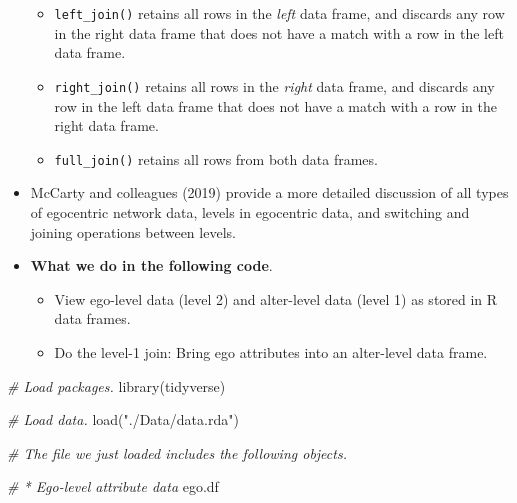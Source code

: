 \documentclass[
]{book}
\newenvironment{Shaded}{\begin{snugshade}}{\end{snugshade}}
\newcommand{\CommentTok}[1]{\textcolor[rgb]{0.56,0.35,0.01}{\textit{#1}}}
\newcommand{\FunctionTok}[1]{\textcolor[rgb]{0.00,0.00,0.00}{#1}}
\newcommand{\NormalTok}[1]{#1}
\newcommand{\StringTok}[1]{\textcolor[rgb]{0.31,0.60,0.02}{#1}}
\providecommand{\tightlist}{%
  \setlength{\itemsep}{0pt}\setlength{\parskip}{0pt}}
\begin{document}
\begin{itemize}
  \begin{itemize}
  \tightlist
  \item
    \texttt{left\_join()} retains all rows in the \emph{left} data frame, and discards any row in the right data frame that does not have a match with a row in the left data frame.
  \item
    \texttt{right\_join()} retains all rows in the \emph{right} data frame, and discards any row in the left data frame that does not have a match with a row in the right data frame.
  \item
    \texttt{full\_join()} retains all rows from both data frames.
  \end{itemize}
\item
  McCarty and colleagues (2019) provide a more detailed discussion of all types of egocentric network data, levels in egocentric data, and switching and joining operations between levels.
\item
  \textbf{What we do in the following code}.

  \begin{itemize}
  \tightlist
  \item
    View ego-level data (level 2) and alter-level data (level 1) as stored in R data frames.
  \item
    Do the level-1 join: Bring ego attributes into an alter-level data frame.
  \end{itemize}
\end{itemize}

\begin{Shaded}
\begin{Highlighting}[]
\CommentTok{\# Load packages.}
\FunctionTok{library}\NormalTok{(tidyverse)}

\CommentTok{\# Load data.}
\FunctionTok{load}\NormalTok{(}\StringTok{"./Data/data.rda"}\NormalTok{)}

\CommentTok{\# The file we just loaded includes the following objects.}

\CommentTok{\# * Ego{-}level attribute data}
\NormalTok{ego.df}
\end{Highlighting}
\end{Shaded}
\end{document}
